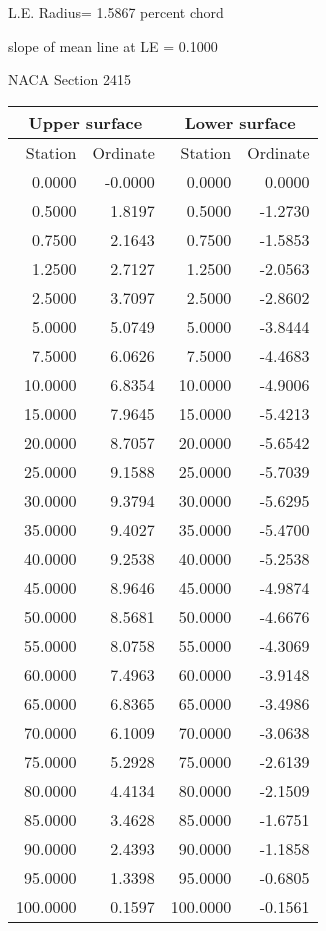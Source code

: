 \documentclass[11pt]{book}
\begin{document}
L.E. Radius=  1.5867 percent chord


 slope of mean line at LE =  0.1000
 \newpage
  \label{s2415}
 \begin{Large}
 NACA Section 2415
 \end{Large}
  
 \vspace{8mm}
 \begin{tabular}{|r|r|r|r|} \hline 
 \multicolumn{2}{|c|}{Upper surface} & \multicolumn{2}{|c|}{Lower surface} \\
 \hline
 Station & Ordinate & Station & Ordinate \\
 \hline
0.0000 & -0.0000 & 0.0000 & 0.0000 \\
0.5000 & 1.8197 & 0.5000 & -1.2730 \\
0.7500 & 2.1643 & 0.7500 & -1.5853 \\
1.2500 & 2.7127 & 1.2500 & -2.0563 \\
2.5000 & 3.7097 & 2.5000 & -2.8602 \\
5.0000 & 5.0749 & 5.0000 & -3.8444 \\
7.5000 & 6.0626 & 7.5000 & -4.4683 \\
10.0000 & 6.8354 & 10.0000 & -4.9006 \\
15.0000 & 7.9645 & 15.0000 & -5.4213 \\
20.0000 & 8.7057 & 20.0000 & -5.6542 \\
25.0000 & 9.1588 & 25.0000 & -5.7039 \\
30.0000 & 9.3794 & 30.0000 & -5.6295 \\
35.0000 & 9.4027 & 35.0000 & -5.4700 \\
40.0000 & 9.2538 & 40.0000 & -5.2538 \\
45.0000 & 8.9646 & 45.0000 & -4.9874 \\
50.0000 & 8.5681 & 50.0000 & -4.6676 \\
55.0000 & 8.0758 & 55.0000 & -4.3069 \\
60.0000 & 7.4963 & 60.0000 & -3.9148 \\
65.0000 & 6.8365 & 65.0000 & -3.4986 \\
70.0000 & 6.1009 & 70.0000 & -3.0638 \\
75.0000 & 5.2928 & 75.0000 & -2.6139 \\
80.0000 & 4.4134 & 80.0000 & -2.1509 \\
85.0000 & 3.4628 & 85.0000 & -1.6751 \\
90.0000 & 2.4393 & 90.0000 & -1.1858 \\
95.0000 & 1.3398 & 95.0000 & -0.6805 \\
100.0000 & 0.1597 & 100.0000 & -0.1561 \\
 \hline 
 \end{tabular}
\end{document}
